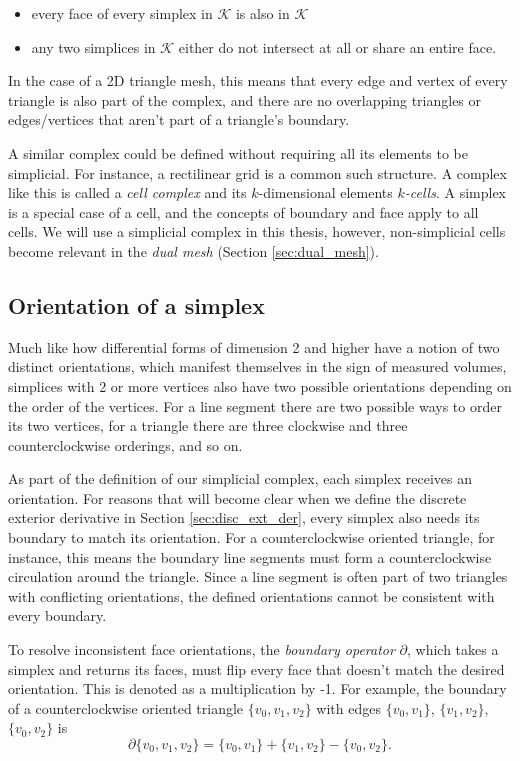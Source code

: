 \documentclass[utf8,english]{gradu3}
\begin{document}
\begin{itemize}
  \item every face of every simplex in $\mathcal{K}$ is also in $\mathcal{K}$
  \item any two simplices in $\mathcal{K}$ either do not intersect at all
    or share an entire face.
\end{itemize}

In the case of a 2D triangle mesh, this means
that every edge and vertex of every triangle is also part of the complex,
and there are no overlapping triangles
or edges/vertices that aren't part of a triangle's boundary.

A similar complex could be defined without requiring
all its elements to be simplicial.
For instance, a rectilinear grid is a common such structure.
A complex like this is called a \textit{cell complex}
and its $k$-dimensional elements \textit{$k$-cells}.
A simplex is a special case of a cell,
and the concepts of boundary and face apply to all cells.
We will use a simplicial complex in this thesis,
however, non-simplicial cells become relevant in the \textit{dual mesh}
(Section \ref{sec:dual_mesh}).


\subsection{Orientation of a simplex}

Much like how differential forms of dimension 2 and higher
have a notion of two distinct orientations,
which manifest themselves in the sign of measured volumes,
simplices with 2 or more vertices also have two possible orientations
depending on the order of the vertices.
For a line segment there are two possible ways to order its two vertices,
for a triangle there are three clockwise and three counterclockwise orderings,
and so on.

As part of the definition of our simplicial complex,
each simplex receives an orientation.
For reasons that will become clear when
we define the discrete exterior derivative in Section \ref{sec:disc_ext_der},
every simplex also needs its boundary to match its orientation.
For a counterclockwise oriented triangle, for instance,
this means the boundary line segments must form
a counterclockwise circulation around the triangle.
Since a line segment is often part of two triangles with conflicting orientations,
the defined orientations cannot be consistent with every boundary.

To resolve inconsistent face orientations,
the \textit{boundary operator} $\partial$,
which takes a simplex and returns its faces,
must flip every face that doesn't match the desired orientation.
This is denoted as a multiplication by -1.
For example, the boundary of a counterclockwise oriented triangle $\{v_0, v_1, v_2\}$
with edges $\{v_0, v_1\}$, $\{v_1, v_2\}$, $\{v_0, v_2\}$ is
\[
  \partial \{v_0, v_1, v_2\} = \{v_0, v_1\} + \{v_1, v_2\} - \{v_0, v_2\}.
\]
\end{document}
